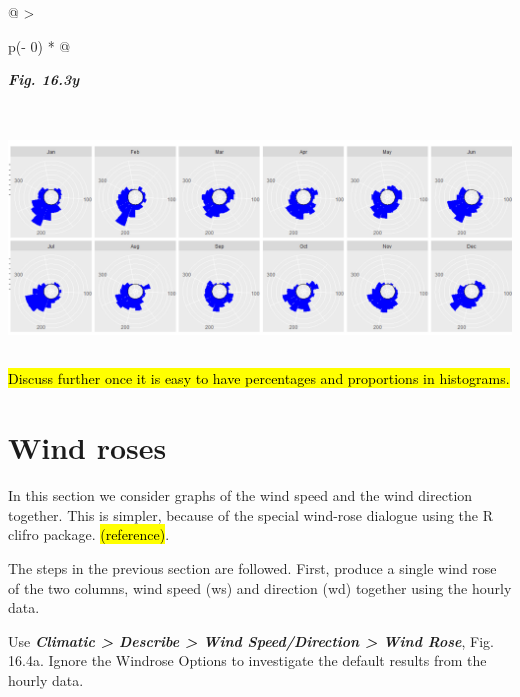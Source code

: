 \documentclass[
  letterpaper,
  DIV=11,
  numbers=noendperiod]{scrreprt}
\begin{document}
\begin{longtable}[]{@{}
  >{\raggedright\arraybackslash}p{(\columnwidth - 0\tabcolsep) * }@{}}
\toprule\noalign{}
\begin{minipage}[b]{\linewidth}\raggedright
\textbf{\emph{Fig. 16.3y}}
\end{minipage} \\
\midrule\noalign{}
\endhead
\bottomrule\noalign{}
\endlastfoot
\includegraphics[width=6.12077in,height=2.36937in]{figures/Fig16.3y.png} \\
\end{longtable}

\hl{Discuss further once it is easy to have percentages and proportions
in histograms.}

\section{Wind roses}\label{wind-roses}

In this section we consider graphs of the wind speed and the wind
direction together. This is simpler, because of the special wind-rose
dialogue using the R clifro package. \hl{(reference)}.

The steps in the previous section are followed. First, produce a single
wind rose of the two columns, wind speed (ws) and direction (wd)
together using the hourly data.

Use \textbf{\emph{Climatic \textgreater{} Describe \textgreater{} Wind
Speed/Direction \textgreater{} Wind Rose}}, Fig. 16.4a. Ignore the
Windrose Options to investigate the default results from the hourly
data.
\end{document}
